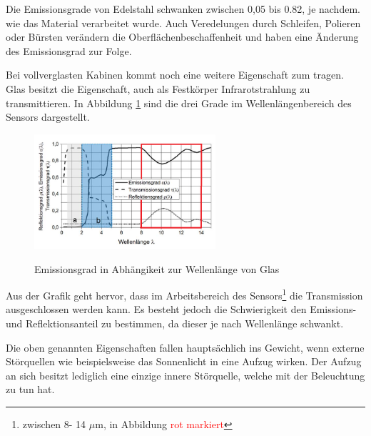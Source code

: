 Die Emissionsgrade von Edelstahl schwanken zwischen 0,05 bis 0.82, je nachdem. wie das Material verarbeitet wurde. Auch Veredelungen durch Schleifen, Polieren oder Bürsten verändern die Oberflächenbeschaffenheit und haben eine Änderung des Emissionsgrad zur Folge. 

Bei vollverglasten Kabinen kommt noch eine weitere Eigenschaft zum tragen. Glas besitzt die Eigenschaft, auch als Festkörper Infrarotstrahlung zu transmittieren. In Abbildung \ref{fig:Glas} sind die drei Grade im  Wellenlängenbereich des Sensors dargestellt. 

\begin{figure}[H]
	\centering
	\includegraphics[width=0.6\textwidth]
	{fig/Glas_bearbeitet.png}
	\caption[Emissionsgrad in Abhängikeit zur Wellenlnge]{Emissionsgrad in Abhängikeit zur Wellenlänge von Glas}\cite{Glas} 
	\label{fig:Glas}	
\end{figure}

Aus der Grafik geht hervor, dass im Arbeitsbereich des Sensors\footnote[10]{zwischen 8- 14 $\mu$m, in Abbildung \textcolor{red}{rot markiert}} die Transmission ausgeschlossen werden kann. Es besteht jedoch die Schwierigkeit den Emissions- und Reflektionsanteil zu bestimmen, da dieser je nach Wellenlänge schwankt.

Die oben genannten Eigenschaften fallen hauptsächlich ins Gewicht, wenn externe Störquellen wie beispielsweise das Sonnenlicht in eine Aufzug wirken. Der Aufzug an sich besitzt lediglich eine einzige innere Störquelle, welche mit der Beleuchtung zu tun hat. 

